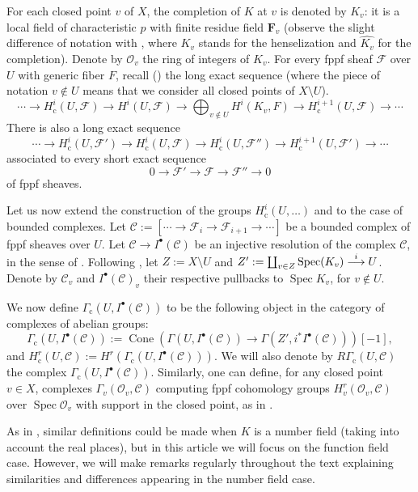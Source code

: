 \documentclass[JEP,XML,SOM,Unicode, NoEqCountersInSection]{cedram}
\let\mathcal\mathscr
\newcommand\To[1]{\mathchoice{\xrightarrow{\textstyle\kern4pt#1\kern3pt}}{\stackrel{#1}{\longrightarrow}}{}{}}
\newcommand{\sbullet}{{\scriptscriptstyle\bullet}}
\newcommand{\rc}{\mathrm{c}}
\theoremstyle{plain}
\theoremstyle{definition}
\DeclareMathOperator\Cone{Cone}
\DeclareMathOperator \spec {Spec}
\newcommand \FF {\mathbf{F}}
\newcommand\cF {\mathcal{F}}
\newcommand\cO {\mathcal{O}}
\newcommand \cC {\mathcal{C}}
\begin{document}
For each closed point $v$ of $X$, the completion of $K$ at $v$
is denoted by $K_v$: it is a local field of characteristic $p$ with
finite residue field $\FF_v$ (observe the slight difference of notation with
\cite{DemH}, where $K_v$ stands for the henselization and $\widehat{K_v}$
for the completion). Denote by $\cO_v$ the ring of integers of $K_v$.
For every fppf sheaf $\cF$
over $U$ with generic fiber $F$, recall (\cite[Prop.\,2.1]{DemH})
the long exact sequence (where the piece of notation $v \not \in U$ means
that we consider all closed points of $X\setminus U$).
\begin{equation} \label{suppcomp}
\cdots\to H^i_\rc(U,\cF) \to H^i(U,\cF) \to \bigoplus_{v \not
\in U} H^i(K_v,F) \to H^{i+1}_\rc(U,\cF) \to\cdots
\end{equation}
There is also a long exact sequence
\begin{equation} \label{longex1}
\cdots\to H^i_\rc(U,\cF') \to H^i_\rc(U,\cF) \to
H^i_\rc(U,\cF'') \to H^{i+1}_\rc(U,\cF ') \to\cdots
\end{equation}
associated to every short exact sequence
\[
0 \to \cF' \to \cF \to \cF'' \to 0
\]
of fppf sheaves.

Let us now extend the construction of the groups $H^i_\rc(U,\dots)$ and \cite[Prop.\,2.1]{DemH} to the case of bounded complexes.
Let $\cC:= [\cdots\to \cF_i \to \cF_{i+1} \to\cdots]$ be a bounded complex of fppf sheaves over $U$.
Let $\cC \to I^\sbullet(\cC)$ be an injective resolution of the complex $\cC$, in the sense of \cite[Tag 013K]{SP}.
Following \cite[\S2]{DemH}, let $Z:= X \setminus U$ and
$Z':= \coprod_{v \in Z} \spec({K_v}) \To{i} U$.
Denote by $\cC_v$ and $I^\sbullet(\cC)_v$ their respective
pullbacks to $\spec K_v$, for $v \notin U$.

We now define $\Gamma_\rc(U, I^\sbullet(\cC))$ to be the following object in the category of complexes of abelian groups:
\[
\Gamma_\rc(U, I^\sbullet(\cC)):= \Cone\left(\Gamma(U, I^\sbullet(\cC)) \to \Gamma(Z', i^* I^\sbullet(\cC)) \right)[-1],
\]
and $H^r_\rc(U, \cC):= H^r(\Gamma_\rc(U, I^\sbullet(\cC)))$. We will also denote by $R\Gamma_\rc(U,\cC)$ the complex $\Gamma_\rc(U, I^\sbullet(\cC))$.
Similarly, one can define, for any closed point $v \in X$, complexes $\Gamma_v(\cO_v, \cC)$ computing fppf cohomology groups $H^r_v(\cO_v, \cC)$ over $\spec \cO_v$ with support in the closed point, as in \cite[before Lem.\,2.6]{DemH}.

As in \cite{DemH}, similar definitions could be made when $K$ is a number field (taking into account the real places), but in this article we will focus on the function field case. However, we will make remarks regularly throughout the text explaining similarities and differences appearing in the number field case.
\end{document}
